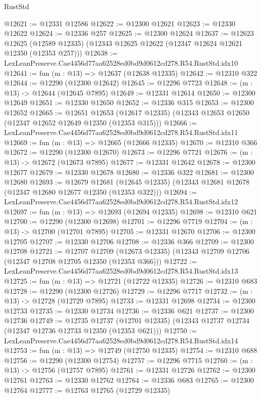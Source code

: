 \begin{lexlean}{RustStd}
\begin{coremodule}
@12621 := @12331 @12586
@12622 := @12300 @12621
@12623 := @12330 @12622
@12624 := @12336 @257
@12625 := @12300 @12624
@12637 := @12623
    @12625
    (@12589 @12335)
    (@12343 @12625 @12622 (@12347 @12624 @12621 @12350 (@12353 @257)))
@12638 := LexLeanPreserve.Cae4456d77aa62528ed0bd9d0612cd278.R54.RustStd.idx10
@12641 := fun (m : @13) => @12637 (@12638 @12335)
@12642 := @12310 @322
@12644 := @12290 (@12300 @12642)
@12645 := @12296 @7723
@12648 := (m : @13) -> @12644 (@12645 @7895)
@12649 := @12331 @12614
@12650 := @12300 @12649
@12651 := @12330 @12650
@12652 := @12336 @315
@12653 := @12300 @12652
@12665 := @12651
    @12653
    (@12617 @12335)
    (@12343 @12653 @12650 (@12347 @12652 @12649 @12350 (@12353 @315)))
@12666 := LexLeanPreserve.Cae4456d77aa62528ed0bd9d0612cd278.R54.RustStd.idx11
@12669 := fun (m : @13) => @12665 (@12666 @12335)
@12670 := @12310 @366
@12672 := @12290 (@12300 @12670)
@12673 := @12296 @7721
@12676 := (m : @13) -> @12672 (@12673 @7895)
@12677 := @12331 @12642
@12678 := @12300 @12677
@12679 := @12330 @12678
@12680 := @12336 @322
@12681 := @12300 @12680
@12693 := @12679
    @12681
    (@12645 @12335)
    (@12343 @12681 @12678 (@12347 @12680 @12677 @12350 (@12353 @322)))
@12694 := LexLeanPreserve.Cae4456d77aa62528ed0bd9d0612cd278.R54.RustStd.idx12
@12697 := fun (m : @13) => @12693 (@12694 @12335)
@12698 := @12310 @621
@12700 := @12290 (@12300 @12698)
@12701 := @12296 @7719
@12704 := (m : @13) -> @12700 (@12701 @7895)
@12705 := @12331 @12670
@12706 := @12300 @12705
@12707 := @12330 @12706
@12708 := @12336 @366
@12709 := @12300 @12708
@12721 := @12707
    @12709
    (@12673 @12335)
    (@12343 @12709 @12706 (@12347 @12708 @12705 @12350 (@12353 @366)))
@12722 := LexLeanPreserve.Cae4456d77aa62528ed0bd9d0612cd278.R54.RustStd.idx13
@12725 := fun (m : @13) => @12721 (@12722 @12335)
@12726 := @12310 @683
@12728 := @12290 (@12300 @12726)
@12729 := @12296 @7717
@12732 := (m : @13) -> @12728 (@12729 @7895)
@12733 := @12331 @12698
@12734 := @12300 @12733
@12735 := @12330 @12734
@12736 := @12336 @621
@12737 := @12300 @12736
@12749 := @12735
    @12737
    (@12701 @12335)
    (@12343 @12737 @12734 (@12347 @12736 @12733 @12350 (@12353 @621)))
@12750 := LexLeanPreserve.Cae4456d77aa62528ed0bd9d0612cd278.R54.RustStd.idx14
@12753 := fun (m : @13) => @12749 (@12750 @12335)
@12754 := @12310 @688
@12756 := @12290 (@12300 @12754)
@12757 := @12296 @7715
@12760 := (m : @13) -> @12756 (@12757 @7895)
@12761 := @12331 @12726
@12762 := @12300 @12761
@12763 := @12330 @12762
@12764 := @12336 @683
@12765 := @12300 @12764
@12777 := @12763
    @12765
    (@12729 @12335)

\end{coremodule}
\end{lexlean}
